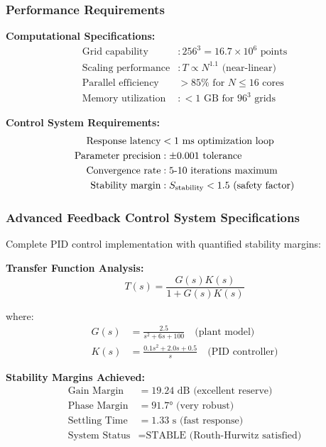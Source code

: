 \documentclass[11pt]{article}
\begin{document}
\subsubsection{Performance Requirements}
\textbf{Computational Specifications:}
\begin{align}
\text{Grid capability} &: 256^3 = 16.7 \times 10^6 \text{ points} \\
\text{Scaling performance} &: T \propto N^{1.1} \text{ (near-linear)} \\
\text{Parallel efficiency} &> 85\% \text{ for } N \leq 16 \text{ cores} \\
\text{Memory utilization} &: < 1 \text{ GB for } 96^3 \text{ grids}
\end{align}

\textbf{Control System Requirements:}
\begin{align}
\text{Response latency} &< 1 \text{ ms optimization loop} \\
\text{Parameter precision} &: \pm 0.001 \text{ tolerance} \\
\text{Convergence rate} &: 5\text{-}10 \text{ iterations maximum} \\
\text{Stability margin} &: S_{\rm stability} < 1.5 \text{ (safety factor)}
\end{align}

\subsubsection{Advanced Feedback Control System Specifications}
Complete PID control implementation with quantified stability margins:

\textbf{Transfer Function Analysis:}
\begin{equation}
T(s) = \frac{G(s)K(s)}{1 + G(s)K(s)}
\end{equation}

where:
\begin{align}
G(s) &= \frac{2.5}{s^2 + 6s + 100} \quad \text{(plant model)} \\
K(s) &= \frac{0.1s^2 + 2.0s + 0.5}{s} \quad \text{(PID controller)}
\end{align}

\textbf{Stability Margins Achieved:}
\begin{align}
\text{Gain Margin} &= 19.24 \text{ dB (excellent reserve)} \\
\text{Phase Margin} &= 91.7° \text{ (very robust)} \\
\text{Settling Time} &= 1.33 \text{ s (fast response)} \\
\text{System Status} &= \text{STABLE (Routh-Hurwitz satisfied)}
\end{align}
\end{document}
